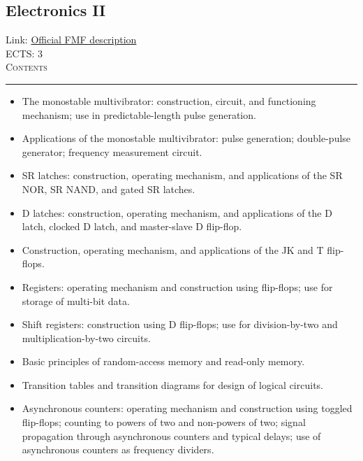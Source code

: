 \documentclass[11pt, a4paper]{article}
\newenvironment{course}[3]{
\subsection{#1}%
Link: \href{#2}{Official FMF description}\\%
ECTS: #3%
\vspace{1ex}
\\
{\large \textsc{Contents}}\\[-0.9ex]%
\rule{\textwidth}{0.5pt}
\vspace{-3ex}
}
{}
\newenvironment{chapter}[1]{
\begin{tcolorbox}[title=#1, breakable]
}
{\end{tcolorbox}}
\begin{document}
\begin{course}{Electronics II}{https://www.fmf.uni-lj.si/en/study-physics/programmes/1fiz/2020/7000777/courses/1135/}{3}
\begin{chapter}{Foundations of digital electronics}
\begin{itemize}
            \item The monostable multivibrator: construction, circuit, and functioning mechanism; use in predictable-length pulse generation.

            \item Applications of the monostable multivibrator: pulse generation; double-pulse generator; frequency measurement circuit.
        
        \end{itemize}
    \end{chapter}

    \begin{chapter}{Flip-flops and registers}
        \begin{itemize}
        
            \item SR latches: construction, operating mechanism, and applications of the SR NOR, SR NAND, and gated SR latches.

            \item D latches: construction, operating mechanism, and applications of the D latch, clocked D latch, and master-slave D flip-flop.

            \item Construction, operating mechanism, and applications of the JK and T flip-flops.

            \item Registers: operating mechanism and construction using flip-flops; use for storage of multi-bit data.

            \item Shift registers: construction using D flip-flops; use for division-by-two and multiplication-by-two circuits.

            \item Basic principles of random-access memory and read-only memory.
        
        \end{itemize}
    \end{chapter}

    \begin{chapter}{Counters and finite-state machines}
        \begin{itemize}

            \item Transition tables and transition diagrams for design of logical circuits.
        
            \item Asynchronous counters: operating mechanism and construction using toggled flip-flops; counting to powers of two and non-powers of two; signal propagation through asynchronous counters and typical delays; use of asynchronous counters as frequency dividers.


\end{itemize}
\end{chapter}
\end{course}
\end{document}
